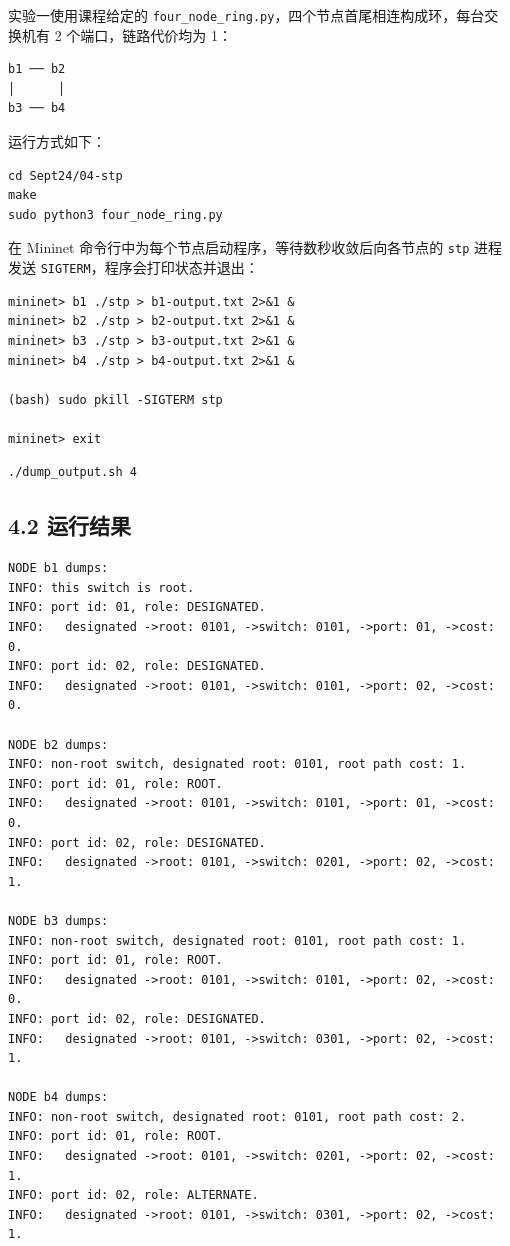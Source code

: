 \documentclass[UTF8,12pt,a4paper,fontset=fandol]{ctexart}
\begin{document}
实验一使用课程给定的 \texttt{four\_node\_ring.py}，四个节点首尾相连构成环，每台交换机有 2 个端口，链路代价均为 1：

\begin{verbatim}
b1 ── b2
│      │
b3 ── b4
\end{verbatim}

运行方式如下：

\begin{verbatim}
cd Sept24/04-stp
make
sudo python3 four_node_ring.py
\end{verbatim}

在 Mininet 命令行中为每个节点启动程序，等待数秒收敛后向各节点的 \texttt{stp} 进程发送 \texttt{SIGTERM}，程序会打印状态并退出：

\begin{verbatim}
mininet> b1 ./stp > b1-output.txt 2>&1 &
mininet> b2 ./stp > b2-output.txt 2>&1 &
mininet> b3 ./stp > b3-output.txt 2>&1 &
mininet> b4 ./stp > b4-output.txt 2>&1 &

(bash) sudo pkill -SIGTERM stp

mininet> exit
\end{verbatim}

\begin{verbatim}
./dump_output.sh 4
\end{verbatim}

\subsection*{4.2 运行结果}

\begin{verbatim}
NODE b1 dumps:
INFO: this switch is root.
INFO: port id: 01, role: DESIGNATED.
INFO:   designated ->root: 0101, ->switch: 0101, ->port: 01, ->cost: 0.
INFO: port id: 02, role: DESIGNATED.
INFO:   designated ->root: 0101, ->switch: 0101, ->port: 02, ->cost: 0.

NODE b2 dumps:
INFO: non-root switch, designated root: 0101, root path cost: 1.
INFO: port id: 01, role: ROOT.
INFO:   designated ->root: 0101, ->switch: 0101, ->port: 01, ->cost: 0.
INFO: port id: 02, role: DESIGNATED.
INFO:   designated ->root: 0101, ->switch: 0201, ->port: 02, ->cost: 1.

NODE b3 dumps:
INFO: non-root switch, designated root: 0101, root path cost: 1.
INFO: port id: 01, role: ROOT.
INFO:   designated ->root: 0101, ->switch: 0101, ->port: 02, ->cost: 0.
INFO: port id: 02, role: DESIGNATED.
INFO:   designated ->root: 0101, ->switch: 0301, ->port: 02, ->cost: 1.

NODE b4 dumps:
INFO: non-root switch, designated root: 0101, root path cost: 2.
INFO: port id: 01, role: ROOT.
INFO:   designated ->root: 0101, ->switch: 0201, ->port: 02, ->cost: 1.
INFO: port id: 02, role: ALTERNATE.
INFO:   designated ->root: 0101, ->switch: 0301, ->port: 02, ->cost: 1.
\end{verbatim}
\end{document}
